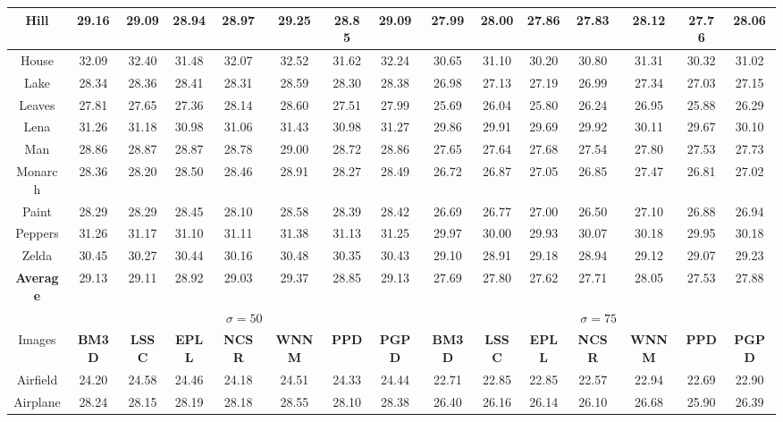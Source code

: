 \begin{table}[t]
\begin{center}
\begin{tabular}{|c||c|c|c|c|c|c|c||c|c|c|c|c|c|c|}
\hline
 Hill & 29.16 & 29.09 & 28.94 & 28.97 & 29.25 &28.85 & 29.09    & 27.99 & 28.00 & 27.86 & 27.83 & 28.12 &27.76 & 28.06 
\\
\hline
 House& 32.09 & 32.40  & 31.48  & 32.07 & 32.52& 31.62& 32.24    & 30.65  & 31.10 & 30.20 & 30.80  & 31.31&30.32 &31.02    
\\
\hline
 Lake   & 28.34 & 28.36  & 28.41   & 28.31   &  28.59&28.30 &28.38    & 26.98  & 27.13 &27.19  & 26.99 &27.34&27.03 & 27.15  
\\
\hline
 Leaves & 27.81 & 27.65& 27.36 & 28.14 & 28.60&27.51 &27.99     & 25.69 & 26.04 & 25.80 &26.24 & 26.95& 25.88 & 26.29  
\\
\hline
 Lena& 31.26 & 31.18  & 30.98 &  31.06& 31.43 &30.98 &31.27     & 29.86& 29.91 & 29.69& 29.92 & 30.11&29.67 &30.10   
\\
\hline
 Man& 28.86 & 28.87 & 28.87 & 28.78 & 29.00& 28.72 & 28.86    & 27.65  & 27.64 & 27.68& 27.54 &27.80 &27.53 & 27.73     
\\
\hline
 Monarch& 28.36 & 28.20 & 28.50 & 28.46 & 28.91& 28.27&28.49    &   26.72  & 26.87 &27.05  & 26.85 & 27.47&26.81 &27.02    
\\
\hline
 Paint & 28.29 & 28.29 & 28.45  &  28.10  & 28.58&28.39 &28.42    &  26.69 &  26.77 & 27.00  & 26.50 & 27.10& 26.88 & 26.94 
\\
\hline
 Peppers & 31.26 & 31.17 & 31.10 & 31.11  & 31.38 &31.13 & 31.25   &   29.97  & 30.00&  29.93 &  30.07 & 30.18&29.95  & 30.18    
\\
\hline
 Zelda & 30.45 & 30.27  & 30.44  &  30.16  & 30.48& 30.35 &30.43    & 29.10&28.91 &29.18  & 28.94 & 29.12&29.07 &29.23   
\\
\hline
 \textbf{Average} &  29.13 & 29.11  &  28.92 & 29.03  & 29.37 & 28.85 & 29.13   &27.69&27.80 & 27.62& 27.71&28.05 &27.53&27.88     
\\
\hline
\hline
&\multicolumn{7}{c||}{ $\sigma = 50$}&\multicolumn{7}{c|}{ $\sigma = 75$}
\\
\hline
\hline
Images&\textbf{BM3D}&\textbf{LSSC}&\textbf{EPLL}&\textbf{NCSR}&\textbf{WNNM}&\textbf{PPD}&\textbf{PGPD}
&\textbf{BM3D}&\textbf{LSSC}&\textbf{EPLL}&\textbf{NCSR}&\textbf{WNNM}&\textbf{PPD}&\textbf{PGPD} 
\\
\hline
 Airfield & 24.20 & 24.58 & 24.46  &24.18 & 24.51& 24.33 & 24.44    & 22.71 & 22.85 & 22.85 & 22.57 &22.94 &22.69 &22.90 
\\
\hline
 Airplane & 28.24 & 28.15 & 28.19 & 28.18 &  28.55&28.10& 28.38     & 26.40 & 26.16 & 26.14  & 26.10 &  26.68&25.90& 26.39

\end{tabular}
\end{center}
\end{table}
